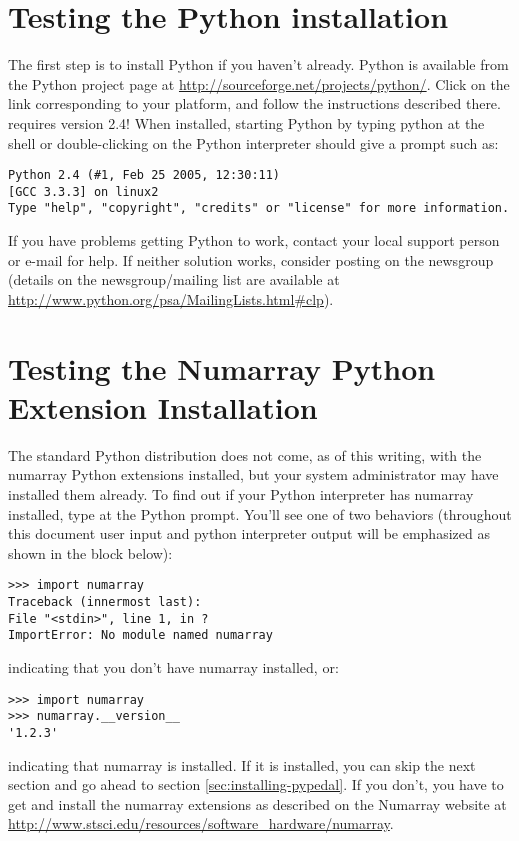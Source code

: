 \section{Testing the Python installation}

The first step is to install Python if you haven't already. Python is available from the Python project page at \url{http://sourceforge.net/projects/python/}.  Click on the link corresponding to your platform, and follow the instructions
described there. \PYPEDAL{} requires version 2.4!  When installed, starting Python by typing python at the shell or double-clicking on the Python interpreter should give a prompt such as:
\begin{verbatim}
Python 2.4 (#1, Feb 25 2005, 12:30:11)
[GCC 3.3.3] on linux2
Type "help", "copyright", "credits" or "license" for more information.
\end{verbatim}
If you have problems getting Python to work, contact your local support person or e-mail   for help. If neither solution works, consider posting on the  newsgroup (details on the newsgroup/mailing list are available
at \url{http://www.python.org/psa/MailingLists.html\#clp}).

\section{Testing the Numarray Python Extension Installation}

The standard Python distribution does not come, as of this writing, with the
numarray Python extensions installed, but your system administrator may have
installed them already. To find out if your Python interpreter has numarray
installed, type  at the Python prompt. You'll see one of
two behaviors (throughout this document user input and python interpreter
output will be emphasized as shown in the block below):
\begin{verbatim}
>>> import numarray
Traceback (innermost last):
File "<stdin>", line 1, in ?
ImportError: No module named numarray
\end{verbatim}
indicating that you don't have numarray installed, or:
\begin{verbatim}
>>> import numarray
>>> numarray.__version__
'1.2.3'
\end{verbatim}
indicating that numarray is installed. If it is installed, you can skip the next section and go ahead to section \ref{sec:installing-pypedal}.  If you don't, you have to get and install the numarray extensions as described on the Numarray website at \url{http://www.stsci.edu/resources/software_hardware/numarray}.


